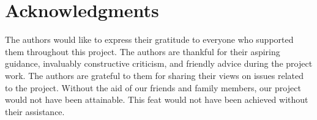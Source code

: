 \documentclass[fleqn, 10pt, twoside]{IOEGC}
\begin{document}
\section*{Acknowledgments}
The authors would like to express their gratitude to everyone who supported
them throughout this project. The authors are thankful for their aspiring guidance,
invaluably constructive criticism, and friendly advice during the project work. The authors are
grateful to them for sharing their views on issues related to the project. Without the aid
of our friends and family members, our project would not have been attainable. This
feat would not have been achieved without their assistance.






\vfill\null
\end{document}
